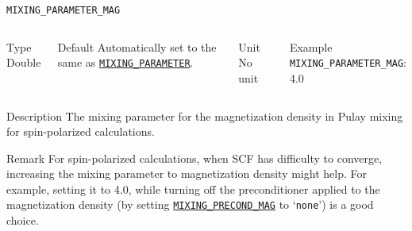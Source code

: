 \documentclass[xcolor=dvipsnames,t]{beamer}
\begin{document}
\begin{frame}[allowframebreaks]{\texttt{MIXING\_PARAMETER\_MAG}} \label{MIXING_PARAMETER_MAG}
\vspace*{-12pt}
\begin{columns}
\begin{block}{Type}
Double
\end{block}

\begin{block}{Default}
Automatically set to the same as \hyperlink{MIXING_PARAMETER}{\texttt{MIXING\_PARAMETER}}.
\end{block}

\begin{block}{Unit}
No unit
\end{block}

\begin{block}{Example}
\texttt{MIXING\_PARAMETER\_MAG}: 4.0
\end{block}
\end{columns}

\begin{block}{Description}
The mixing parameter for the magnetization density in Pulay mixing for spin-polarized calculations.
\end{block}

\begin{block}{Remark}
    For spin-polarized calculations, when SCF has difficulty to converge, increasing the mixing parameter to magnetization density might help. For example, setting it to 4.0, while turning off the preconditioner applied to the magnetization density (by setting \hyperlink{MIXING_PRECOND_MAG}{\texttt{MIXING\_PRECOND\_MAG}} to `\texttt{none}') is a good choice.
\end{block}

\end{frame}
\end{document}
